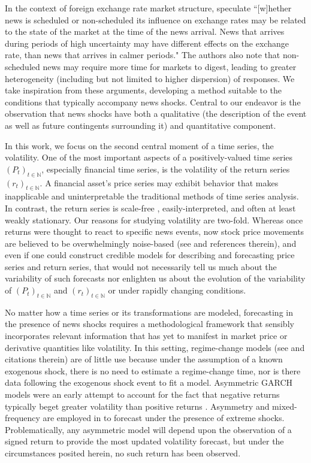 \documentclass{uiucthesis2021}
\theoremstyle{definition}
\begin{document}
In the context of foreign exchange rate market structure, \cite[][]{dominguez2006defines} speculate ``[w]hether news is scheduled or non-scheduled its influence on exchange rates may be related to the state of the market at the time of the news arrival.  News that arrives during periods of high uncertainty may have different effects on the exchange rate, than news that arrives in calmer periods." The authors also note that non-scheduled news may require more time for markets to digest, leading to greater heterogeneity (including but not limited to higher dispersion) of responses.  We take inspiration from these arguments, developing a method suitable to the conditions that typically accompany news shocks.  Central to our endeavor is the observation that news shocks have both a qualitative (the description of the event as well as future contingents surrounding it) and quantitative component.%

In this work, we focus on the second central moment of a time series, the volatility.  One of the most important aspects of a positively-valued time series $(P_{t})_{t\in\mathbb{N}}$, especially financial time series, is the volatility of the return series $(r_{t})_{t\in\mathbb{N}}$.  A financial asset's price series may exhibit behavior that makes inapplicable and uninterpretable the traditional methods of time series analysis.  In contrast, the return series is scale-free \parencite[][]{tsay2005analysis}, easily-interpreted, and often at least weakly stationary.  Our reasons for studying volatility are two-fold.  Whereas once returns were thought to react to specific news events, now stock price movements are believed to be overwhelmingly noise-based (see \cite[][]{boudoukh2019information} and references therein), and even if one could construct credible models for describing and forecasting price series and return series, that would not necessarily tell us much about the variability of such forecasts nor enlighten us about the evolution of the variability of $(P_{t})_{t\in\mathbb{N}}$ and $(r_{t})_{t\in\mathbb{N}}$ or under rapidly changing conditions. 

No matter how a time series or its transformations are modeled, forecasting in the presence of news shocks requires a methodological framework that sensibly incorporates relevant information that has yet to manifest in market price or derivative quantities like volatility.  In this setting, regime-change models (see \parencite[][]{bauwens2006regime} and citations therein) are of little use because under the assumption of a known exogenous shock, there is no need to estimate a regime-change time, nor is there data following the exogenous shock event to fit a model.  Asymmetric GARCH models were an early attempt to account for the fact that negative returns typically beget greater volatility than positive returns \parencite{hansen2012realized}.  Asymmetry and mixed-frequency are employed in \cite[][]{wang2020forecasting} to forecast under the presence of extreme shocks.  Problematically, any asymmetric model will depend upon the observation of a signed return to provide the most updated volatility forecast, but under the circumstances posited herein, no such return has been observed.
\end{document}
